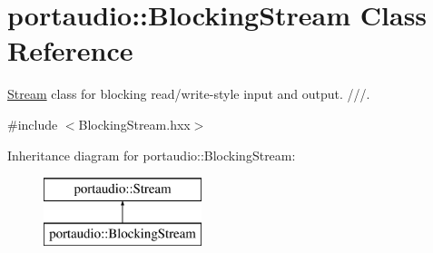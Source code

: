 \hypertarget{classportaudio_1_1_blocking_stream}{}\section{portaudio\+:\+:Blocking\+Stream Class Reference}
\label{classportaudio_1_1_blocking_stream}


\hyperlink{classportaudio_1_1_stream}{Stream} class for blocking read/write-\/style input and output. ///.  




{\ttfamily \#include $<$Blocking\+Stream.\+hxx$>$}

Inheritance diagram for portaudio\+:\+:Blocking\+Stream\+:\begin{figure}[H]
\begin{center}
\leavevmode
\includegraphics[height=2.000000cm]{classportaudio_1_1_blocking_stream}
\end{center}
\end{figure}
